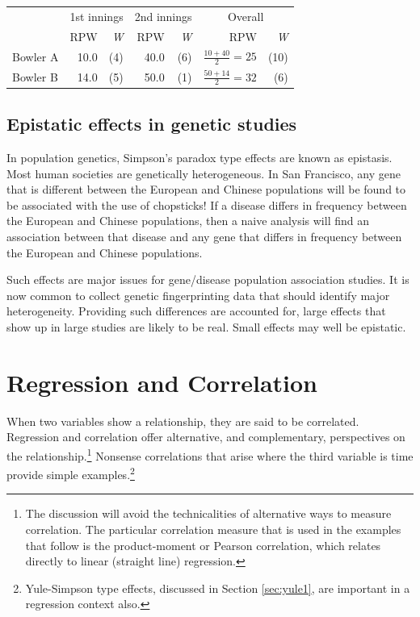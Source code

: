 \documentclass[
  10pt,
  b5paper]{book}
\begin{document}
\vspace*{-5pt}

\begin{center}
\begin{tabular}{lrr||rr||rr}
\hline
 & \multicolumn{2}{c}{1st innings} & \multicolumn{2}{c}{2nd innings} &
\multicolumn{2}{c}{Overall} \\
\cline{2-3} \cline{4-5} \cline{6-7}
         &  RPW & {\em W}   &  RPW & {\em W} &
           RPW & {\em W} \\[4pt]
Bowler A &  10.0 & (4) & 40.0 & (6)  &
$\frac{10+40}{2} = 25$ & (10)\\[4pt]
Bowler B & 14.0 & (5)  & 50.0 & (1) & $\frac{50+14}{2} = 32$  &  (6)\\[4pt]
\cline{2-3} \cline{4-5} \cline{6-7}
\end{tabular}
\end{center}

\hypertarget{epistatic-effects-in-genetic-studies}{%
\section{Epistatic effects in genetic studies}\label{epistatic-effects-in-genetic-studies}}

In population genetics, Simpson's paradox type effects are known as epistasis. Most human societies are genetically heterogeneous. In San Francisco, any gene that is different between the European and Chinese populations will be found to be associated with the use of chopsticks! If a disease differs in frequency between the European and Chinese populations, then a naive analysis will find an association between that disease and any gene that differs in frequency between the European and Chinese populations.

Such effects are major issues for gene/disease population association studies. It is now common to collect genetic fingerprinting data that should identify major heterogeneity. Providing such differences are accounted for, large effects that show up in large studies are likely to be real. Small effects may well be epistatic.

\hypertarget{sec:reg}{%
\chapter{Regression and Correlation}\label{sec:reg}}

When two variables show a relationship, they are said to be correlated. Regression and correlation offer alternative, and complementary, perspectives on the relationship.\footnote{The discussion will avoid the technicalities of alternative ways to measure correlation. The particular correlation measure that is used in the examples that follow is the product-moment or Pearson correlation, which relates directly to linear (straight line) regression.} Nonsense correlations that arise where the third variable is time provide simple examples.\footnote{Yule-Simpson type effects, discussed in Section \ref{sec:yule1}, are important in a regression context also.}
\end{document}
